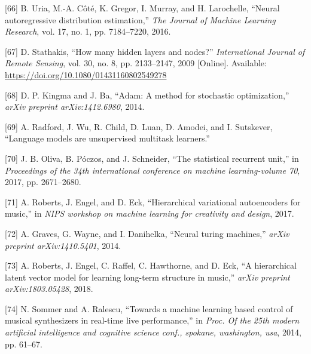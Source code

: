 \documentclass[12pt,]{article}
\begin{document}
\leavevmode\hypertarget{ref-uria2016neural}{}%
{[}66{]} B. Uria, M.-A. Côté, K. Gregor, I. Murray, and H. Larochelle,
``Neural autoregressive distribution estimation,'' \emph{The Journal of
Machine Learning Research}, vol. 17, no. 1, pp. 7184--7220, 2016.

\leavevmode\hypertarget{ref-doi10108001431160802549278}{}%
{[}67{]} D. Stathakis, ``How many hidden layers and nodes?''
\emph{International Journal of Remote Sensing}, vol. 30, no. 8, pp.
2133--2147, 2009 {[}Online{]}. Available:
\url{https://doi.org/10.1080/01431160802549278}

\leavevmode\hypertarget{ref-kingma2014adam}{}%
{[}68{]} D. P. Kingma and J. Ba, ``Adam: A method for stochastic
optimization,'' \emph{arXiv preprint arXiv:1412.6980}, 2014.

\leavevmode\hypertarget{ref-radford2018language}{}%
{[}69{]} A. Radford, J. Wu, R. Child, D. Luan, D. Amodei, and I.
Sutskever, ``Language models are unsupervised multitask learners.''

\leavevmode\hypertarget{ref-oliva2017statistical}{}%
{[}70{]} J. B. Oliva, B. Póczos, and J. Schneider, ``The statistical
recurrent unit,'' in \emph{Proceedings of the 34th international
conference on machine learning-volume 70}, 2017, pp. 2671--2680.

\leavevmode\hypertarget{ref-roberts2017hierarchical}{}%
{[}71{]} A. Roberts, J. Engel, and D. Eck, ``Hierarchical variational
autoencoders for music,'' in \emph{NIPS workshop on machine learning for
creativity and design}, 2017.

\leavevmode\hypertarget{ref-graves2014neural}{}%
{[}72{]} A. Graves, G. Wayne, and I. Danihelka, ``Neural turing
machines,'' \emph{arXiv preprint arXiv:1410.5401}, 2014.

\leavevmode\hypertarget{ref-roberts2018hierarchical}{}%
{[}73{]} A. Roberts, J. Engel, C. Raffel, C. Hawthorne, and D. Eck, ``A
hierarchical latent vector model for learning long-term structure in
music,'' \emph{arXiv preprint arXiv:1803.05428}, 2018.

\leavevmode\hypertarget{ref-sommer2014towards}{}%
{[}74{]} N. Sommer and A. Ralescu, ``Towards a machine learning based
control of musical synthesizers in real-time live performance,'' in
\emph{Proc. Of the 25th modern artificial intelligence and cognitive
science conf., spokane, washington, usa}, 2014, pp. 61--67.
\end{document}
